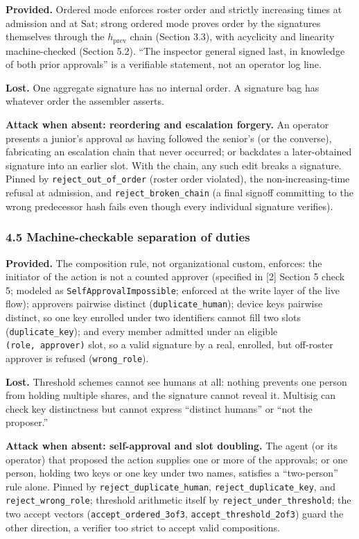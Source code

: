 \documentclass[
  11pt,
]{article}
\begin{document}
\textbf{Provided.} Ordered mode enforces roster order and strictly
increasing times at admission and at $\mathrm{Sat}$; strong ordered
mode proves order by the signatures themselves through the
$h_{\mathrm{prev}}$ chain (Section 3.3), with acyclicity and linearity
machine-checked (Section 5.2). ``The inspector general signed last, in
knowledge of both prior approvals'' is a verifiable statement, not an
operator log line.

\textbf{Lost.} One aggregate signature has no internal order. A
signature bag has whatever order the assembler asserts.

\textbf{Attack when absent: reordering and escalation forgery.} An
operator presents a junior's approval as having followed the senior's
(or the converse), fabricating an escalation chain that never occurred;
or backdates a later-obtained signature into an earlier slot. With the
chain, any such edit breaks a signature. Pinned by
\texttt{reject\_out\_of\_order} (roster order violated), the
non-increasing-time refusal at admission, and
\texttt{reject\_broken\_chain} (a final signoff committing to the wrong
predecessor hash fails even though every individual signature verifies).

\subsubsection{4.5 Machine-checkable separation of
duties}\label{machine-checkable-sod}

\textbf{Provided.} The composition rule, not organizational custom,
enforces: the initiator of the action is not a counted approver
(specified in {[}2{]} Section 5 check 5; modeled as
\texttt{SelfApprovalImpossible}; enforced at the write layer of the live
flow); approvers pairwise distinct (\texttt{duplicate\_human}); device
keys pairwise distinct, so one key enrolled under two identifiers cannot
fill two slots (\texttt{duplicate\_key}); and every member admitted
under an eligible \texttt{(role,\ approver)} slot, so a valid signature
by a real, enrolled, but off-roster approver is refused
(\texttt{wrong\_role}).

\textbf{Lost.} Threshold schemes cannot see humans at all: nothing
prevents one person from holding multiple shares, and the signature
cannot reveal it. Multisig can check key distinctness but cannot express
``distinct humans'' or ``not the proposer.''

\textbf{Attack when absent: self-approval and slot doubling.} The agent
(or its operator) that proposed the action supplies one or more of the
approvals; or one person, holding two keys or one key under two names,
satisfies a ``two-person'' rule alone. Pinned by
\texttt{reject\_duplicate\_human}, \texttt{reject\_duplicate\_key}, and
\texttt{reject\_wrong\_role}; threshold arithmetic itself by
\texttt{reject\_under\_threshold}; the two accept vectors
(\texttt{accept\_ordered\_3of3}, \texttt{accept\_threshold\_2of3}) guard
the other direction, a verifier too strict to accept valid compositions.
\end{document}
